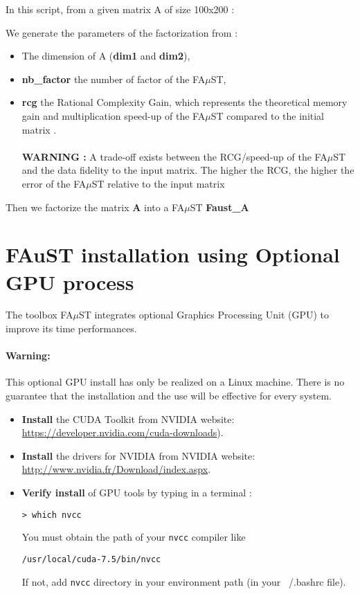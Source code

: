 In this script, from a given matrix A of size 100x200 :

We generate the parameters of the factorization from :
\begin{itemize}
\item The dimension of A (\textbf{dim1} and \textbf{dim2}),
\item \textbf{nb\_factor} the number of factor of the FA$\mu$ST,
\item \textbf{rcg} the Rational Complexity Gain, which represents the theoretical memory gain and multiplication speed-up of the FA$\mu$ST compared to the initial matrix .
\\ \\\textbf{WARNING :}  A trade-off exists between the RCG/speed-up of the FA$\mu$ST and the data fidelity to the input matrix.
The higher the RCG, the higher the error of the FA$\mu$ST relative to the input matrix
\end{itemize}

\lstset{style=customBash}

Then we factorize the matrix \textbf{A} into a FA$\mu$ST \textbf{Faust\_A}



\section{FAuST installation using Optional GPU process}\label{sec:OptionalGPU}

The toolbox FA$\mu$ST integrates optional Graphics Processing Unit (GPU) to improve its time performances.
\paragraph{Warning:} This optional GPU install has only be realized on a Linux machine. There is no guarantee that the installation and the use will be effective for every system.

\begin{itemize}
\item \textbf{Install} the CUDA Toolkit from NVIDIA website:  \url{https://developer.nvidia.com/cuda-downloads}).
\item \textbf{Install} the drivers for NVIDIA from NVIDIA website: \url{http://www.nvidia.fr/Download/index.aspx}.
\item \textbf{Verify install} of GPU tools by typing in a terminal :
\lstset{style=customBash} 
\begin{lstlisting}
> which nvcc
\end{lstlisting}
You must obtain the path of your \texttt{nvcc} compiler like 
\begin{lstlisting}
/usr/local/cuda-7.5/bin/nvcc
\end{lstlisting}
If not, add \texttt{nvcc} directory in your environment path (in your ~/.bashrc file). 
\end{itemize}

